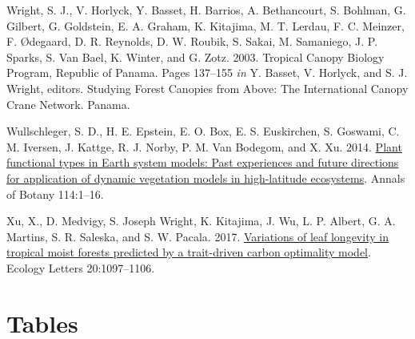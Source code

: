 \documentclass[
  12pt,
]{article}
\newlength{\cslhangindent} %
\newlength{\cslentryspacingunit} %
\newenvironment{CSLReferences}[2] %
 {%
  \setlength{\parindent}{0pt} %
  \ifodd #1 %
  \let\oldpar\par %
  \def\par{\hangindent=\cslhangindent\oldpar} %
  \fi %
  \setlength{\parskip}{#2\cslentryspacingunit} %
 }%
 {} %
\begin{document}
\begin{CSLReferences}{1}{0}
\leavevmode{}%
Wright, S. J., V. Horlyck, Y. Basset, H. Barrios, A. Bethancourt, S. Bohlman, G. Gilbert, G. Goldstein, E. A. Graham, K. Kitajima, M. T. Lerdau, F. C. Meinzer, F. Ødegaard, D. R. Reynolds, D. W. Roubik, S. Sakai, M. Samaniego, J. P. Sparks, S. Van Bael, K. Winter, and G. Zotz. 2003. Tropical {Canopy Biology Program}, {Republic} of {Panama}. Pages 137--155 \emph{in} Y. Basset, V. Horlyck, and S. J. Wright, editors. Studying {Forest Canopies} from {Above}: {The International Canopy Crane Network}. {Panama}.

\leavevmode{}%
Wullschleger, S. D., H. E. Epstein, E. O. Box, E. S. Euskirchen, S. Goswami, C. M. Iversen, J. Kattge, R. J. Norby, P. M. Van Bodegom, and X. Xu. 2014. \href{https://doi.org/10.1093/aob/mcu077}{Plant functional types in {Earth} system models: {Past} experiences and future directions for application of dynamic vegetation models in high-latitude ecosystems}. Annals of Botany 114:1--16.

\leavevmode{}%
Xu, X., D. Medvigy, S. Joseph Wright, K. Kitajima, J. Wu, L. P. Albert, G. A. Martins, S. R. Saleska, and S. W. Pacala. 2017. \href{https://doi.org/10.1111/ele.12804}{Variations of leaf longevity in tropical moist forests predicted by a trait-driven carbon optimality model}. Ecology Letters 20:1097--1106.

\end{CSLReferences}

\newpage

\hypertarget{tables}{%
\section{Tables}\label{tables}}
\end{document}
